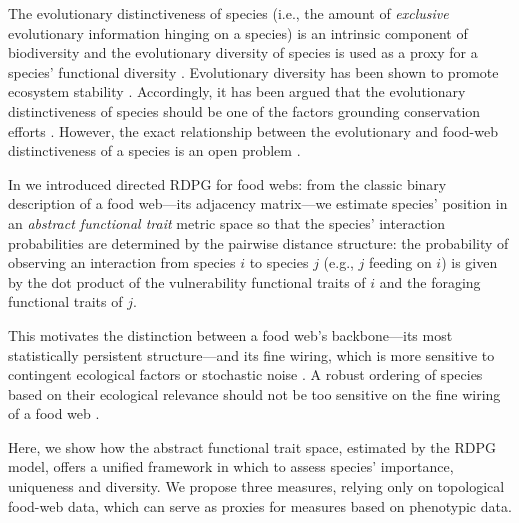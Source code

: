 \documentclass[]{rsos}%
\begin{document}
The evolutionary distinctiveness of species (i.e., the amount of
\emph{exclusive} evolutionary information hinging on a species) is an
intrinsic component of biodiversity \citep{mace2003preserving} and the
evolutionary diversity of species is used as a proxy for a species' functional
diversity \citep{winter2013phylogenetic}. Evolutionary diversity has been shown
to promote ecosystem stability \citep{cadotte2012phylogenetic}. Accordingly, it
has been argued that the evolutionary distinctiveness of species should be one
of the factors grounding conservation efforts
\citep{faith1992conservation,redding2006incorporating,isaac2007mammals}.
However, the exact relationship between the evolutionary and food-web
distinctiveness of a species is an open problem
\citep{gerhold2015phylogenetic,miranda2015congruence}.

In \citep{dallariva2015exploring} we introduced directed RDPG for food webs: from
the classic binary description of a food web---its adjacency matrix---we
estimate species' position in an \emph{abstract functional trait} metric space
so that the species' interaction probabilities are determined by the pairwise
distance structure: the probability of observing an interaction from species $i$
to species $j$ (e.g., $j$ feeding on $i$) is given by the dot product of the vulnerability
functional traits of $i$ and the foraging functional traits of $j$.

This motivates the distinction between a food web's backbone---its most statistically persistent
structure---and its fine wiring, which is more sensitive to contingent ecological
factors or stochastic noise \citep{grady2012robust, bellingeri2015food}. A robust ordering of species
based on their ecological relevance should not be too sensitive on
the fine wiring of a food web \citep{livi2011identifying}.

Here, we show how the abstract functional trait space, estimated by the RDPG model,
offers a unified framework in which to assess species' importance, uniqueness
and diversity. We propose three measures, relying only on topological food-web data,
which can serve as proxies for measures based on phenotypic data. 
\end{document}
